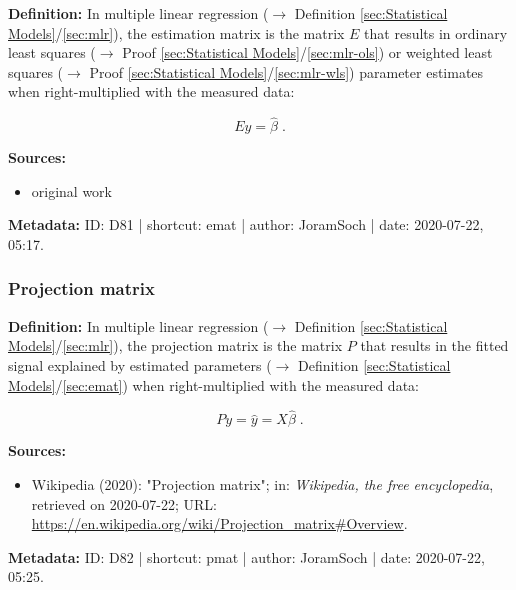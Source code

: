 \documentclass[a4paper,12pt,twoside]{book}
\begin{document}
\textbf{Definition:} In multiple linear regression ($\rightarrow$ Definition \ref{sec:Statistical Models}/\ref{sec:mlr}), the estimation matrix is the matrix $E$ that results in ordinary least squares ($\rightarrow$ Proof \ref{sec:Statistical Models}/\ref{sec:mlr-ols}) or weighted least squares ($\rightarrow$ Proof \ref{sec:Statistical Models}/\ref{sec:mlr-wls}) parameter estimates when right-multiplied with the measured data:

\begin{equation} \label{eq:emat-em}
Ey = \hat{\beta} \; .
\end{equation}


\vspace{1em}
\textbf{Sources:}
\begin{itemize}
\item original work\end{itemize}


\vspace{1em}
\textbf{Metadata:} ID: D81 | shortcut: emat | author: JoramSoch | date: 2020-07-22, 05:17.
\vspace{1em}



\subsubsection[\textit{Projection matrix}]{Projection matrix} \label{sec:pmat}
\setcounter{equation}{0}

\textbf{Definition:} In multiple linear regression ($\rightarrow$ Definition \ref{sec:Statistical Models}/\ref{sec:mlr}), the projection matrix is the matrix $P$ that results in the fitted signal explained by estimated parameters ($\rightarrow$ Definition \ref{sec:Statistical Models}/\ref{sec:emat}) when right-multiplied with the measured data:

\begin{equation} \label{eq:pmat-pm}
Py = \hat{y} = X \hat{\beta} \; .
\end{equation}


\vspace{1em}
\textbf{Sources:}
\begin{itemize}
\item Wikipedia (2020): "Projection matrix"; in: \textit{Wikipedia, the free encyclopedia}, retrieved on 2020-07-22; URL: \url{https://en.wikipedia.org/wiki/Projection_matrix#Overview}.
\end{itemize}


\vspace{1em}
\textbf{Metadata:} ID: D82 | shortcut: pmat | author: JoramSoch | date: 2020-07-22, 05:25.
\vspace{1em}
\end{document}
